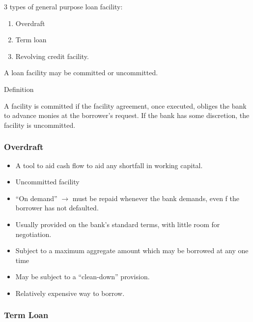 \documentclass[
]{article}
\providecommand{\tightlist}{%
  \setlength{\itemsep}{0pt}\setlength{\parskip}{0pt}}
\newenvironment{env-f09e27d9-67b8-4931-ab1f-ca6031966775}
{
    \savenotes\tcolorbox[blanker,breakable,left=5pt,borderline west={2pt}{-4pt}{yellow}]
}
{
    \endtcolorbox\spewnotes
}
\begin{document}
3 types of general purpose loan facility:

\begin{enumerate}
\tightlist
\item
  Overdraft
\item
  Term loan
\item
  Revolving credit facility.
\end{enumerate}

A loan facility may be committed or uncommitted.

\begin{env-f09e27d9-67b8-4931-ab1f-ca6031966775}

Definition

A facility is committed if the facility agreement, once executed,
obliges the bank to advance monies at the borrower's request. If the
bank has some discretion, the facility is uncommitted.

\end{env-f09e27d9-67b8-4931-ab1f-ca6031966775}

\hypertarget{overdraft}{%
\subsubsection{Overdraft}\label{overdraft}}

\begin{itemize}
\tightlist
\item
  A tool to aid cash flow to aid any shortfall in working capital.
\item
  Uncommitted facility
\item
  ``On demand'' {\(\rightarrow\)} must be repaid whenever the bank
  demands, even f the borrower has not defaulted.
\item
  Usually provided on the bank's standard terms, with little room for
  negotiation.
\item
  Subject to a maximum aggregate amount which may be borrowed at any one
  time
\item
  May be subject to a ``clean-down'' provision.
\item
  Relatively expensive way to borrow.
\end{itemize}

\hypertarget{term-loan}{%
\subsubsection{Term Loan}\label{term-loan}}
\end{document}
